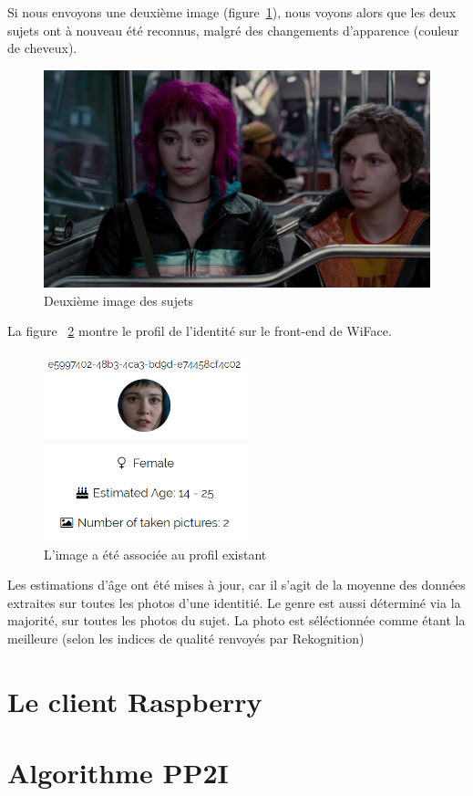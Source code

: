 Si nous envoyons une deuxième image (figure~\ref{fig:scott2}), nous voyons alors que les deux sujets ont à nouveau été reconnus, malgré des changements d'apparence (couleur de cheveux).

\begin{figure}[H]
	\centering
	\includegraphics[width=12cm]{images/facial_reco/scott2.png}
    \caption{Deuxième image des sujets}
	\label{fig:scott2}
\end{figure}

La figure ~\ref{fig:ramona_profile} montre le profil de l'identité sur le front-end de WiFace.
\begin{figure}[H]
	\centering
	\includegraphics[width=6cm]{images/facial_reco/ramona_profile.png}
    \caption{L'image a été associée au profil existant}
	\label{fig:ramona_profile}
\end{figure}

Les estimations d'âge ont été mises à jour, car il s'agit de la moyenne des données extraites sur toutes les photos d'une identitié.
Le genre est aussi déterminé via la majorité, sur toutes les photos du sujet. 
La photo est séléctionnée comme étant la meilleure (selon les indices de qualité renvoyés par Rekognition)
\section{Le client Raspberry}

\section{Algorithme PP2I}